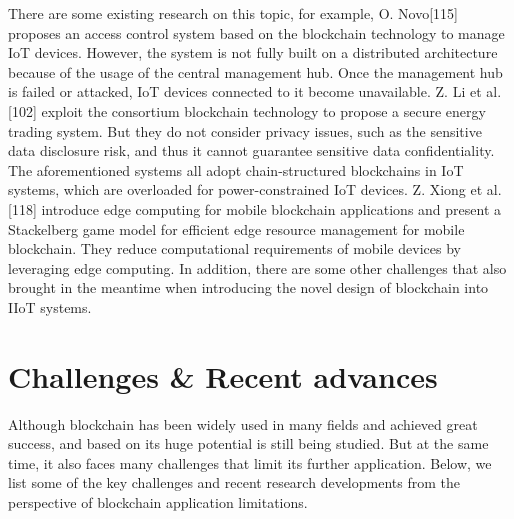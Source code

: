 \documentclass[lettersize,journal]{IEEEtran}
\begin{document}
There are some existing research on this topic, for example, O. Novo[115] proposes an access control system based on the blockchain technology to manage IoT devices. However, the system is not fully built on a distributed architecture because of the usage of the central management hub. Once the management hub is failed or attacked, IoT devices connected to it become unavailable. Z. Li et al.[102] exploit the consortium blockchain technology to propose a secure energy trading system. But they do not consider privacy issues, such as the sensitive data disclosure risk, and thus it cannot guarantee sensitive data confidentiality. The aforementioned systems all adopt chain-structured blockchains in IoT systems, which are overloaded for power-constrained IoT devices. Z. Xiong et al. [118] introduce edge computing for mobile blockchain applications and present a Stackelberg game model for efficient edge resource management for mobile blockchain. They reduce computational requirements of mobile devices by leveraging edge computing. In addition, there are some other challenges that also brought in the meantime when introducing the novel design of blockchain into IIoT systems.
\section{Challenges \& Recent advances}
Although blockchain has been widely used in many fields and achieved great success, and based on its huge potential is still being studied. But at the same time, it also faces many challenges that limit its further application. Below, we list some of the key challenges and recent research developments from the perspective of blockchain application limitations.
\end{document}

